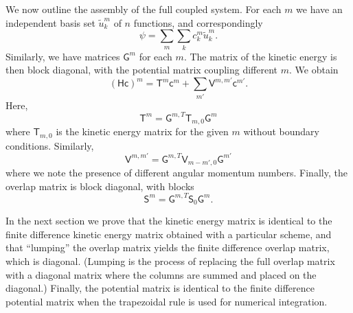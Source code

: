 \documentclass{article}
\begin{document}
We now outline the assembly of the full coupled system. For each $m$ we have an independent basis set $\tilde{u}^m_k$ of $n$ functions, and correspondingly
\begin{equation}
    \psi = \sum_m \sum_k c_k^m \tilde{u}^m_k.
\end{equation}
Similarly, we have matrices $\mathsf{G}^m$ for each $m$. The matrix of the kinetic energy is then block diagonal, with the potential matrix coupling different $m$. We obtain
\begin{equation}
    (\mathsf{H} \mathsf{c})^m = \mathsf{T}^m \mathsf{c}^m + \sum_{m'} \mathsf{V}^{m,m'} \mathsf{c}^{m'}.
\end{equation}
Here,
\begin{equation}
    \mathsf{T}^m = \mathsf{G}^{m,T} \mathsf{T}_{m,0} \mathsf{G}^m
\end{equation} 
where $\mathsf{T}_{m,0}$ is the kinetic energy matrix for the given $m$ without boundary conditions. Similarly,
\begin{equation}
    \mathsf{V}^{m,m'} = \mathsf{G}^{m,T} \mathsf{V}_{m-m',0} \mathsf{G}^{m'}
\end{equation} 
where we note the presence of different angular momentum numbers. Finally, the overlap matrix is block diagonal, with blocks
\begin{equation}
    \mathsf{S}^{m} = \mathsf{G}^{m,T} \mathsf{S}_0 \mathsf{G}^m.
\end{equation}






In the next section we prove that the kinetic energy matrix is identical to the finite difference kinetic energy matrix obtained with a particular scheme, and that ``lumping'' the overlap matrix yields the finite difference overlap matrix, which is diagonal. (Lumping is the process of replacing the full overlap matrix with a diagonal matrix where the columns are summed and placed on the diagonal.) Finally, the potential matrix is identical to the finite difference potential matrix when the trapezoidal rule is used for numerical integration.
\end{document}
